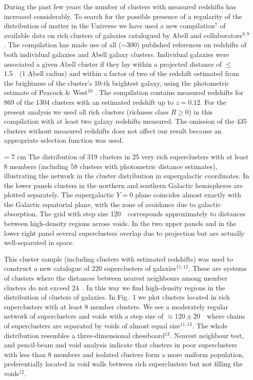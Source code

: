 During the past few years the number of clusters with measured redshifts has
increased considerably. To search for the possible presence of a regularity of
the distribution of matter in the Universe we have used a new compilation$^7$
of available data on rich clusters of galaxies catalogued by Abell and
collaborators{$^{8,9}$}.  The compilation has made use of all ($\sim$300)
published references on redshifts of both individual galaxies and Abell galaxy
clusters. Individual galaxies were associated  a given Abell cluster
if they lay within a projected distance of $\leq$1.5~\Mpc\ (1 Abell radius)
and within a factor of two of the redshift estimated from the brightness of
the cluster's 10-th brightest galaxy, using the photometric estimate of
Peacock \& West$^{10}$ .  The compilation contains measured redshifts for 869 of the
1304 clusters with an estimated redshift up to $z=0.12$. For the present
analysis we used all rich clusters (richness class $R\ge 0$) in this
compilation with at least two galaxy redshifts measured. The omission of the
435 clusters without measured redshifts does not affect our result because an
appropriate selection function was used.

\midinsert
\vskip 50mm
{\epsfysize= 7 cm }
 The distribution of 319 clusters in 25 very rich
superclusters with at least 8 members (including 58 clusters with photometric
distance estimates), illustrating the network in the cluster distribution in
supergalactic coordinates. In the lower panels clusters in the northern and
southern Galactic hemispheres are plotted separately.  The supergalactic $Y=0$
plane coincides almost exactly with the Galactic equatorial plane,  with the zone of avoidance due to galactic absorption. The grid with step
size 120~\Mpc\ corresponds approximately to distances between high-density
regions across voids.  In the two upper panels and in the lower right panel
several superclusters overlap due to projection but are actually
well-separated in space.
\endinsert




This cluster sample (including clusters with estimated redshifts) was used to
construct a new catalogue of 220 superclusters of galaxies$^{11,12}$.  These
are systems of clusters where the distances between nearest neighbours among
member clusters do not exceed 24~\Mpc. In this way we find high-density
regions in the distribution of clusters of galaxies. In Fig.~1 we plot
clusters located in rich superclusters with at least 8 member clusters.  We
see a moderately regular network of superclusters and voids with a step size
of $\approx 120 \pm 20$~\Mpc\ where chains of superclusters are separated by
voids of almost equal size$^{11,12}$.  The whole distribution resembles a
three-dimensional chessboard$^{13}$.  Nearest neighbour test, and pencil-beam
and void analysis indicate that clusters in poor superclusters with less than
8 members and isolated clusters form a more uniform population, preferentially
located in void walls between rich superclusters but not filling the
voids$^{12}$.


